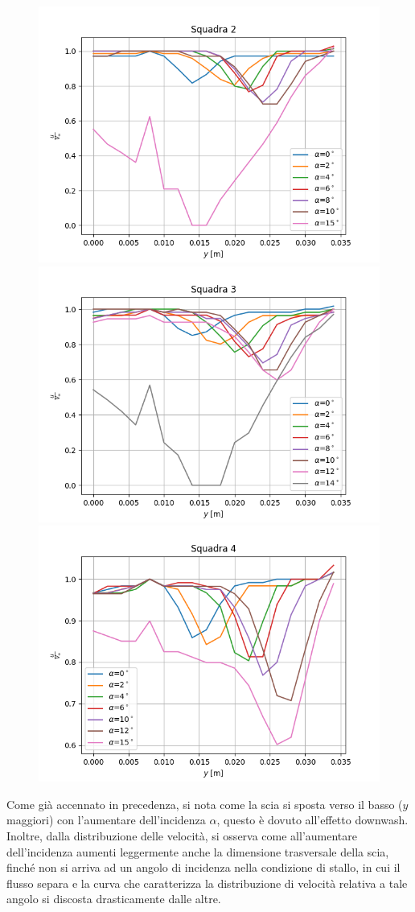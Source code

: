 \begin{figure}[H]
    \centering
    \includegraphics[width=.65\textwidth]{images/6/v2.png}
    \includegraphics[width=.65\textwidth]{images/6/v3.png}
    \includegraphics[width=.65\textwidth]{images/6/v4.png}
\end{figure}

\noindent Come già accennato in precedenza, si nota come la scia si sposta verso il basso ($y$ maggiori) con l'aumentare dell'incidenza $\alpha$, questo è dovuto all'effetto downwash. Inoltre, dalla distribuzione delle velocità, si osserva come all'aumentare dell'incidenza aumenti leggermente anche la dimensione trasversale della scia, finché non si arriva ad un angolo di incidenza nella condizione di stallo, in cui il flusso separa e la curva che caratterizza la distribuzione di velocità relativa a tale angolo si discosta drasticamente dalle altre.
